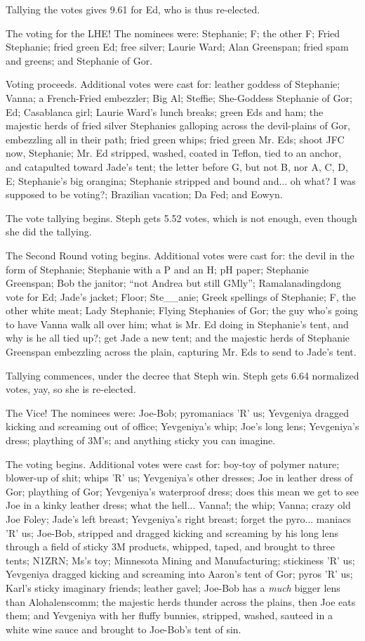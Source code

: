 \documentclass[12pt]{article}
\begin{document}
Tallying the votes gives 9.61 for Ed, who is thus re-elected.

The voting for the LHE!  The nominees were: Stephanie; F; the other
F; Fried Stephanie; fried green Ed; free silver; Laurie Ward; Alan
Greenspan; fried spam and greens; and Stephanie of Gor.

Voting proceeds.  Additional votes were cast for: leather goddess of
Stephanie; Vanna; a French-Fried embezzler; Big Al; Steffie; She-Goddess
Stephanie of Gor; Ed; Casablanca girl; Laurie Ward's lunch breaks;
green Eds and ham; the majestic herds of fried silver Stephanies
galloping across the devil-plains of Gor, embezzling all in their path;
fried green whips; fried green Mr. Eds; shoot JFC now, Stephanie;
Mr. Ed stripped, washed, coated in Teflon, tied to an anchor, and
catapulted toward Jade's tent; the letter before G, but not B, nor
A, C, D, E; Stephanie's big orangina; Stephanie stripped and bound
and... oh what?  I was supposed to be voting?; Brazilian vacation;
Da Fed; and Eowyn.

The vote tallying begins.  Steph gets 5.52 votes, which is not enough,
even though she did the tallying.

The Second Round voting begins.  Additional votes were cast for:
the devil in the form of Stephanie; Stephanie with a P and an H;
pH paper; Stephanie Greenspan; Bob the janitor; ``not Andrea but
still GMly''; Ramalanadingdong vote for Ed; Jade's jacket; Floor;
Ste\_\_anie; Greek spellings of Stephanie; F, the other white meat;
Lady Stephanie; Flying Stephanies of Gor; the guy who's going to
have Vanna walk all over him; what is Mr. Ed doing in Stephanie's
tent, and why is he all tied up?; get Jade a new tent; and the majestic
herds of Stephanie Greenspan embezzling across the plain, capturing
Mr. Eds to send to Jade's tent.

Tallying commences, under the decree that Steph win.  Steph gets
6.64 normalized votes, yay, so she is re-elected.

The Vice!  The nominees were: Joe-Bob; pyromaniacs 'R' us; Yevgeniya
dragged kicking and screaming out of office; Yevgeniya's whip; Joe's
long lens; Yevgeniya's dress; plaything of 3M's; and anything sticky
you can imagine.

The voting begins.  Additional votes were cast for: boy-toy of polymer
nature; blower-up of shit; whips 'R' us; Yevgeniya's other dresses;
Joe in leather dress of Gor; plaything of Gor; Yevgeniya's waterproof
dress; does this mean we get to see Joe in a kinky leather dress;
what the hell... Vanna!; the whip; Vanna; crazy old Joe Foley; Jade's
left breast; Yevgeniya's right breast; forget the pyro... maniacs 'R'
us; Joe-Bob, stripped and dragged kicking and screaming by his long
lens through a field of sticky 3M products, whipped, taped, and brought
to three tents; N1ZRN; Ms's toy; Minnesota Mining and Manufacturing;
stickiness 'R' us; Yevgeniya dragged kicking and screaming into Aaron's
tent of Gor; pyros 'R' us; Karl's sticky imaginary friends; leather
gavel; Joe-Bob has a {\em much} bigger lens than Alohalenscomm; the
majestic herds thunder across the plains, then Joe eats them; and Yevgeniya
with her fluffy bunnies, stripped, washed, sauteed in a white wine
sauce and brought to Joe-Bob's tent of sin.
\end{document}
